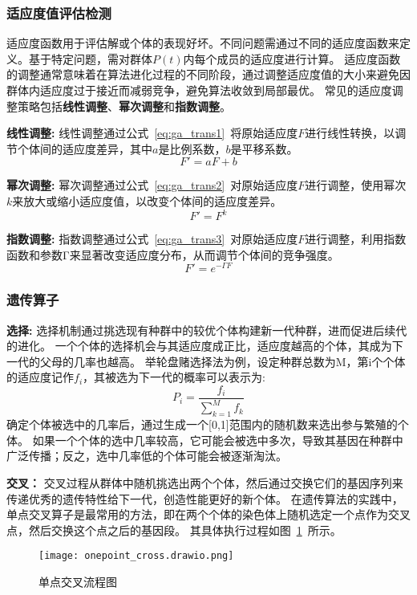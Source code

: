 \subsubsection*{适应度值评估检测}
适应度函数用于评估解或个体的表现好坏。不同问题需通过不同的适应度函数来定义。基于特定问题，需对群体$P(t)$内每个成员的适应度进行计算。
适应度函数的调整通常意味着在算法进化过程的不同阶段，通过调整适应度值的大小来避免因群体内适应度过于接近而减弱竞争，避免算法收敛到局部最优。
常见的适应度调整策略包括\textbf{线性调整}、\textbf{幂次调整}和\textbf{指数调整}。

  \textbf{线性调整:}
  线性调整通过公式~\ref{eq:ga_trans1}~将原始适应度$F$进行线性转换，以调节个体间的适应度差异，其中$a$是比例系数，$b$是平移系数。
    \begin{equation}
      \label{eq:ga_trans1}
      F' = aF + b
    \end{equation}
    
    
    
    \textbf{幂次调整:}
    幂次调整通过公式~\ref{eq:ga_trans2}~对原始适应度$F$进行调整，使用幂次$k$来放大或缩小适应度值，以改变个体间的适应度差异。
    \begin{equation}
      \label{eq:ga_trans2}
      F' = F^k
    \end{equation}
    
    \textbf{指数调整:}
    指数调整通过公式~\ref{eq:ga_trans3}~对原始适应度$F$进行调整，利用指数函数和参数Γ来显著改变适应度分布，从而调节个体间的竞争强度。
    \begin{equation}
      \label{eq:ga_trans3}
      F' = e^{-\Gamma F}
    \end{equation}

\subsubsection*{遗传算子}
\textbf{选择:}
选择机制通过挑选现有种群中的较优个体构建新一代种群，进而促进后续代的进化。
一个个体的选择机会与其适应度成正比，适应度越高的个体，其成为下一代的父母的几率也越高。
举轮盘赌选择法为例，设定种群总数为M，第i个个体的适应度记作$f_i$，其被选为下一代的概率可以表示为:
\begin{equation}
  \label{eq:selection}
  P_i = \frac{f_i}{\sum\limits_{k=1}^{M} f_k}
\end{equation}
确定个体被选中的几率后，通过生成一个[0,1]范围内的随机数来选出参与繁殖的个体。
如果一个个体的选中几率较高，它可能会被选中多次，导致其基因在种群中广泛传播；反之，选中几率低的个体可能会被逐渐淘汰。

\textbf{交叉：}
交叉过程从群体中随机挑选出两个个体，然后通过交换它们的基因序列来传递优秀的遗传特性给下一代，创造性能更好的新个体。
在遗传算法的实践中，单点交叉算子是最常用的方法，即在两个个体的染色体上随机选定一个点作为交叉点，然后交换这个点之后的基因段。
其具体执行过程如图~\ref{fig:onepoint_corss}~所示。
\begin{figure}[htbp]
  \centering
  \texttt{[image: onepoint\_cross.drawio.png]}
  \caption{单点交叉流程图}
  \label{fig:onepoint_corss}
\end{figure}

